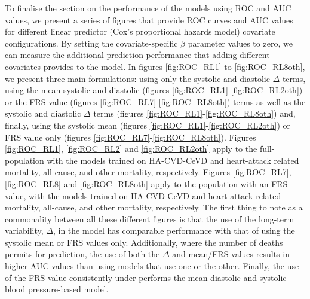 \documentclass[
]{article}
\begin{document}
To finalise the section on the performance of the models using ROC and AUC values, we present a series of figures that provide ROC curves and AUC values for different linear predictor (Cox's proportional hazards model) covariate configurations. By setting the covariate-specific \(\beta\) parameter values to zero, we can measure the additional prediction performance that adding different covariates provides to the model. In figures \ref{fig:ROC_RL1} to \ref{fig:ROC_RL8oth}, we present three main formulations: using only the systolic and diastolic \(\Delta\) terms, using the mean systolic and diastolic (figures \ref{fig:ROC_RL1}-\ref{fig:ROC_RL2oth}) or the FRS value (figures \ref{fig:ROC_RL7}-\ref{fig:ROC_RL8oth}) terms as well as the systolic and diastolic \(\Delta\) terms (figures \ref{fig:ROC_RL1}-\ref{fig:ROC_RL8oth}) and, finally, using the systolic mean (figures \ref{fig:ROC_RL1}-\ref{fig:ROC_RL2oth}) or FRS value only (figures \ref{fig:ROC_RL7}-\ref{fig:ROC_RL8oth}). Figures \ref{fig:ROC_RL1}, \ref{fig:ROC_RL2} and \ref{fig:ROC_RL2oth} apply to the full-population with the models trained on HA-CVD-CeVD and heart-attack related mortality, all-cause, and other mortality, respectively. Figures \ref{fig:ROC_RL7}, \ref{fig:ROC_RL8} and \ref{fig:ROC_RL8oth} apply to the population with an FRS value, with the models trained on HA-CVD-CeVD and heart-attack related mortality, all-cause, and other mortality, respectively. The first thing to note as a commonality between all these different figures is that the use of the long-term variability, \(\Delta\), in the model has comparable performance with that of using the systolic mean or FRS values only. Additionally, where the number of deaths permits for prediction, the use of both the \(\Delta\) and mean/FRS values results in higher AUC values than using models that use one or the other. Finally, the use of the FRS value consistently under-performs the mean diastolic and systolic blood pressure-based model.
\end{document}
